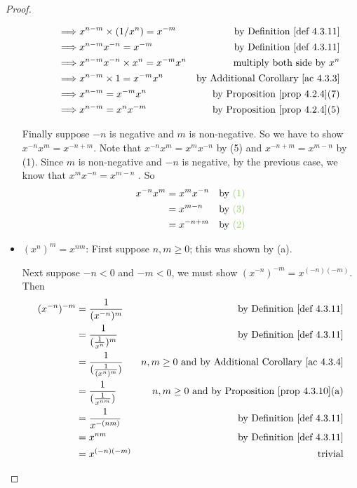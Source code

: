 \begin{proof}
\begin{itemize}
\begin{itemize}
\begin{align*}
                    \implies & x^{n-m} \X (1 / x^n) = x^{-m} & \text{by \DEF{4.3.11}} \\
                    \implies & x^{n-m} x^{-n} = x^{-m} & \text{by \DEF{4.3.11}} \\
                    \implies & x^{n-m} x^{-n} \X x^n = x^{-m} x^n & \text{multiply both side by \(x^n\)} \\
                    \implies & x^{n-m} \X 1 = x^{-m}x^n & \text{by \AC{4.3.3}} \\
                    \implies & x^{n-m} = x^{-m}x^n & \text{by \PROP{4.2.4}(7)} \\
                    \implies & x^{n-m} = x^n x^{-m} & \text{by \PROP{4.2.4}(5)} \\
                \end{align*}
        \end{itemize}
        
        Finally suppose \(-n\) is negative and \(m\) is non-negative.
        So we have to show \(x^{-n}x^m = x^{-n + m}\).
        Note that \(x^{-n} x^m = x^m x^{-n}\)  by (5) and \(x^{-n+m} = x^{m-n}\)  by (1).
        Since \(m\) is non-negative and \(-n\) is negative, by the previous case, we know that \(x^m x^{-n} = x^{m-n}\) .
        So
        \begin{align*}
            x^{-n} x^m & = x^m x^{-n} & \text{by \GREEN{(1)}} \\
                       & = x^{m - n} & \text{by \GREEN{(3)}} \\
                       & = x^{-n + m} & \text{by \GREEN{(2)}}
        \end{align*}
        
    \item \((x^n)^m = x^{nm}\):
        First suppose \(n, m \ge 0\); this was shown by (a).
        
        Next suppose \(-n < 0\) and \(-m < 0\), we must show \((x^{-n})^{-m} = x^{(-n)(-m)}\).
        Then
        \begin{align*}
            (x^{-n})^{-m} & = \frac {1} { (x^{-n})^m } & \text{by \DEF{4.3.11}} \\
                          & = \frac {1} { (\frac {1} {x^n} )^m} & \text{by \DEF{4.3.11}} \\
                          & = \frac {1} { (\frac {1} {(x^n)^m} )} & \text{\(n, m \ge 0\) and by \AC{4.3.4}} \\
                          & = \frac {1} { (\frac {1} {x^{nm}} )} & \text{\(n, m \ge 0\) and by \PROP{4.3.10}(a)} \\
                          & = \frac {1} { x^{-(nm)} } & \text{by \DEF{4.3.11}} \\
                          & = x^{nm} & \text{by \DEF{4.3.11}} \\
                          & = x^{(-n)(-m)} & \text{trivial}
        \end{align*}
        

\end{itemize}
\end{proof}
